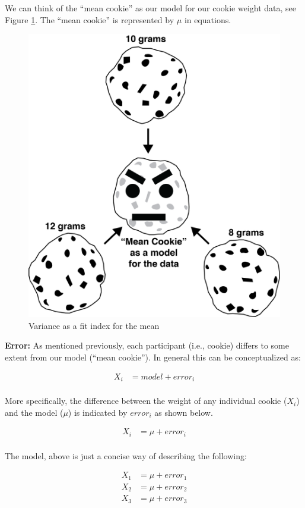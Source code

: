 \documentclass[
]{krantz}
\begin{document}
We can think of the ``mean cookie'' as our model for our cookie weight data, see Figure \ref{fig:meancookie}. The ``mean cookie'' is represented by \(\mu\) in equations.

\begin{figure}
\includegraphics[width=0.6\linewidth]{ch_populations/images/cookie} \caption{Variance as a fit index for the mean}\label{fig:meancookie}
\end{figure}

\textbf{Error:} As mentioned previously, each participant (i.e., cookie) differs to some extent from our model (``mean cookie''). In general this can be conceptualized as:

\[
\begin{aligned} 
X_i &= model + error_i \\
\end{aligned} 
\]

More specifically, the difference between the weight of any individual cookie (\(X_i\)) and the model (\(\mu\)) is indicated by \(error_i\) as shown below.

\[
\begin{aligned} 
X_i &= \mu + error_i \\
\end{aligned} 
\]

The model, above is just a concise way of describing the following:

\[
\begin{aligned} 
X_1 &= \mu + error_1 \\
X_2 &= \mu + error_2 \\
X_3 &= \mu + error_3 \\
\end{aligned} 
\]
\end{document}
